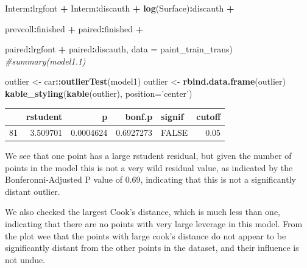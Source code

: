 \documentclass[]{article}
\newenvironment{Shaded}{\begin{snugshade}}{\end{snugshade}}
\newcommand{\CommentTok}[1]{\textcolor[rgb]{0.56,0.35,0.01}{\textit{#1}}}
\newcommand{\DataTypeTok}[1]{\textcolor[rgb]{0.13,0.29,0.53}{#1}}
\newcommand{\KeywordTok}[1]{\textcolor[rgb]{0.13,0.29,0.53}{\textbf{#1}}}
\newcommand{\NormalTok}[1]{#1}
\newcommand{\OperatorTok}[1]{\textcolor[rgb]{0.81,0.36,0.00}{\textbf{#1}}}
\newcommand{\StringTok}[1]{\textcolor[rgb]{0.31,0.60,0.02}{#1}}
\begin{document}
\begin{Shaded}
\begin{Highlighting}[]
\StringTok{                   }\NormalTok{Interm}\OperatorTok{:}\NormalTok{lrgfont }\OperatorTok{+}\StringTok{ }\NormalTok{Interm}\OperatorTok{:}\NormalTok{discauth }\OperatorTok{+}\StringTok{ }\KeywordTok{log}\NormalTok{(Surface)}\OperatorTok{:}\NormalTok{discauth }\OperatorTok{+}\StringTok{ }

\StringTok{                   }\NormalTok{prevcoll}\OperatorTok{:}\NormalTok{finished }\OperatorTok{+}\StringTok{ }\NormalTok{paired}\OperatorTok{:}\NormalTok{finished }\OperatorTok{+}\StringTok{ }

\StringTok{                   }\NormalTok{paired}\OperatorTok{:}\NormalTok{lrgfont }\OperatorTok{+}\StringTok{ }\NormalTok{paired}\OperatorTok{:}\NormalTok{discauth, }\DataTypeTok{data =}\NormalTok{ paint_train_trans)}
\CommentTok{#summary(model1.1)}
\end{Highlighting}
\end{Shaded}

\begin{Shaded}
\begin{Highlighting}[]
\NormalTok{outlier <-}\StringTok{ }\NormalTok{car}\OperatorTok{::}\KeywordTok{outlierTest}\NormalTok{(model1)}
\NormalTok{outlier <-}\StringTok{ }\KeywordTok{rbind.data.frame}\NormalTok{(outlier)}
\KeywordTok{kable_styling}\NormalTok{(}\KeywordTok{kable}\NormalTok{(outlier), }\DataTypeTok{position=}\StringTok{'center'}\NormalTok{)}
\end{Highlighting}
\end{Shaded}

\begin{table}[H]
\centering
\begin{tabular}{l|r|r|r|l|r}
\hline
  & rstudent & p & bonf.p & signif & cutoff\\
\hline
81 & 3.509701 & 0.0004624 & 0.6927273 & FALSE & 0.05\\
\hline
\end{tabular}
\end{table}

We see that one point has a large rstudent residual, but given the
number of points in the model this is not a very wild residual value, as
indicated by the Bonferonni-Adjusted P value of 0.69, indicating that
this is not a significantly distant outlier.

We also checked the largest Cook's distance, which is much less than
one, indicating that there are no points with very large leverage in
this model. From the plot wee that the points with large cook's distance
do not appear to be significantly distant from the other points in the
dataset, and their influence is not undue.
\end{document}
